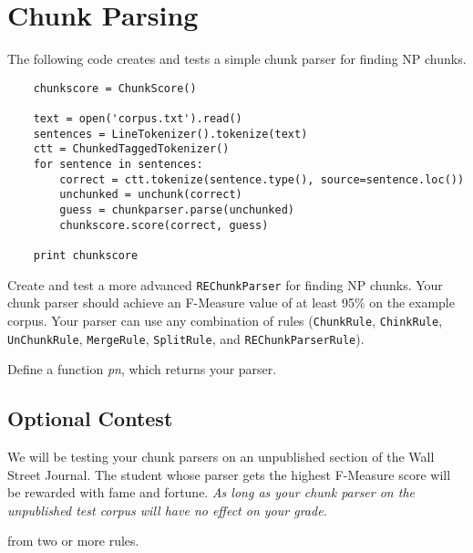 

\section{Chunk Parsing}

  The following code creates and tests a simple chunk parser for
  finding NP chunks.

\begin{verbatim}
    chunkscore = ChunkScore()

    text = open('corpus.txt').read()
    sentences = LineTokenizer().tokenize(text)
    ctt = ChunkedTaggedTokenizer()
    for sentence in sentences:
        correct = ctt.tokenize(sentence.type(), source=sentence.loc())
        unchunked = unchunk(correct)
        guess = chunkparser.parse(unchunked)
        chunkscore.score(correct, guess)

    print chunkscore
\end{verbatim}

  Create and test a more advanced \texttt{REChunkParser} for finding
  NP chunks.  Your chunk parser should achieve an F-Measure value of
  at least 95\% on the example corpus.  Your parser can use any
  combination of rules (\texttt{ChunkRule}, \texttt{ChinkRule},
  \texttt{UnChunkRule}, \texttt{MergeRule}, \texttt{SplitRule}, and
  \texttt{REChunkParserRule}).

  Define a function \textit{pn}, which returns your parser.

  \subsection*{Optional Contest}

    We will be testing your chunk parsers on an unpublished section of
    the Wall Street Journal.  The student whose parser gets the
    highest F-Measure score will be rewarded with fame and fortune.
    \emph{As long as your chunk parser on the unpublished test corpus
    will have no effect on your grade.}



from two or more rules.
